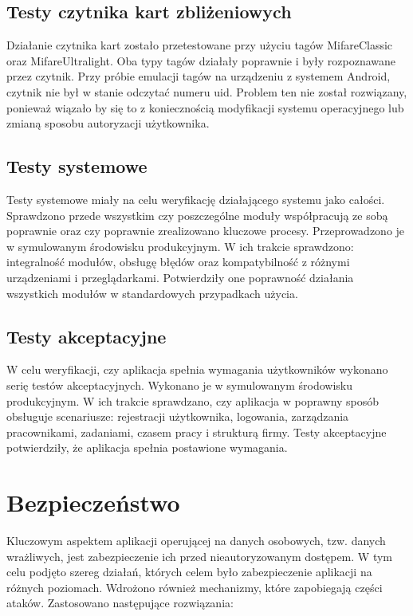 \subsection{Testy czytnika kart zbliżeniowych}

Działanie czytnika kart zostało przetestowane przy użyciu tagów MifareClassic oraz MifareUltralight. Oba typy tagów działały poprawnie i były rozpoznawane przez czytnik. Przy próbie emulacji tagów na urządzeniu z systemem Android, czytnik nie był w stanie odczytać numeru uid. Problem ten nie został rozwiązany, ponieważ wiązało by się to z koniecznością modyfikacji systemu operacyjnego lub zmianą sposobu autoryzacji użytkownika.

\subsection{Testy systemowe}

Testy systemowe miały na celu weryfikację działającego systemu jako całości. Sprawdzono przede wszystkim czy poszczególne moduły współpracują ze sobą poprawnie oraz czy poprawnie zrealizowano kluczowe procesy. Przeprowadzono je w symulowanym środowisku produkcyjnym. W ich trakcie sprawdzono: integralność modułów, obsługę błędów oraz kompatybilność z różnymi urządzeniami i przeglądarkami. Potwierdziły one poprawność działania wszystkich modułów w standardowych przypadkach użycia.

\subsection{Testy akceptacyjne}

W celu weryfikacji, czy aplikacja spełnia wymagania użytkowników wykonano serię testów akceptacyjnych. Wykonano je w symulowanym środowisku produkcyjnym. W ich trakcie sprawdzano, czy aplikacja w poprawny sposób obsługuje scenariusze: rejestracji użytkownika, logowania, zarządzania pracownikami, zadaniami, czasem pracy i strukturą firmy. Testy akceptacyjne potwierdziły, że aplikacja spełnia postawione wymagania.

\section{Bezpieczeństwo}

Kluczowym aspektem aplikacji operującej na danych osobowych, tzw. danych wrażliwych, jest zabezpieczenie ich przed nieautoryzowanym dostępem. W tym celu podjęto szereg działań, których celem było zabezpieczenie aplikacji na różnych poziomach. Wdrożono również mechanizmy, które zapobiegają części ataków. Zastosowano następujące rozwiązania:

